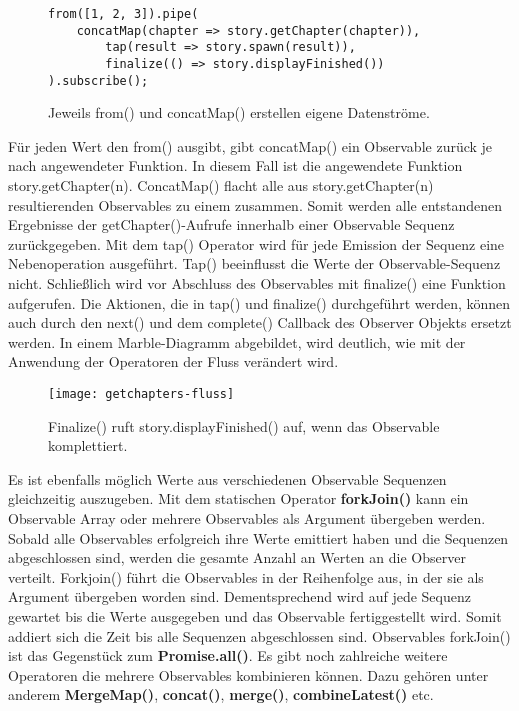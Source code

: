 \begin{figure}[H]
\begin{lstlisting}[basicstyle=\small]
from([1, 2, 3]).pipe(
    concatMap(chapter => story.getChapter(chapter)),
        tap(result => story.spawn(result)),
        finalize(() => story.displayFinished())
).subscribe();
\end{lstlisting}
\caption{Jeweils from() und concatMap() erstellen eigene Datenströme.}
\end{figure}

\noindent
Für jeden Wert den from() ausgibt, gibt concatMap() ein Observable zurück je nach angewendeter Funktion. In diesem Fall ist die angewendete Funktion story.getChapter(n). ConcatMap() flacht alle aus story.getChapter(n) resultierenden Observables zu einem zusammen. Somit werden alle entstandenen Ergebnisse der getChapter()-Aufrufe innerhalb einer Observable Sequenz zurückgegeben. Mit dem tap() Operator wird für jede Emission der Sequenz eine Nebenoperation ausgeführt. Tap() beeinflusst die Werte der Observable-Sequenz nicht. Schließlich wird vor Abschluss des Observables mit finalize() eine Funktion aufgerufen. Die Aktionen, die in tap() und finalize() durchgeführt werden, können auch durch den next() und dem complete() Callback des Observer Objekts ersetzt werden. In einem Marble-Diagramm abgebildet, wird deutlich, wie mit der Anwendung der Operatoren der Fluss verändert wird.

\begin{figure}[H]
\centering
\texttt{[image: getchapters-fluss]}
\caption{Finalize() ruft story.displayFinished() auf, wenn das Observable komplettiert.}
\end{figure}


\noindent
Es ist ebenfalls möglich Werte aus verschiedenen Observable Sequenzen gleichzeitig auszugeben. Mit dem statischen Operator \textbf{forkJoin()} kann ein Observable Array oder mehrere Observables als Argument übergeben werden. Sobald alle Observables erfolgreich ihre Werte emittiert haben und die Sequenzen abgeschlossen sind, werden die gesamte Anzahl an Werten an die Observer verteilt. Forkjoin() führt die Observables in der Reihenfolge aus, in der sie als Argument übergeben worden sind. Dementsprechend wird auf jede Sequenz gewartet bis die Werte ausgegeben und das Observable fertiggestellt wird. Somit addiert sich die Zeit bis alle Sequenzen abgeschlossen sind. Observables forkJoin() ist das Gegenstück zum \textbf{Promise.all()}. Es gibt noch zahlreiche weitere Operatoren die mehrere Observables kombinieren können. Dazu gehören unter anderem \textbf{MergeMap()}, \textbf{concat()}, \textbf{merge()}, \textbf{combineLatest()} etc.\\


